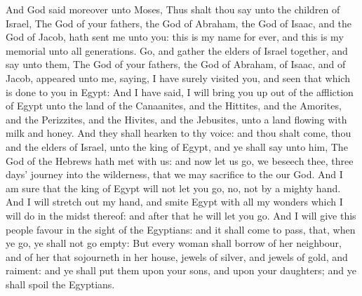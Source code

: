 \begin{biblechapter}
\verse And God said moreover unto Moses, Thus shalt thou say unto the children of Israel, The \LORD God of your fathers, the God of Abraham, the God of Isaac, and the God of Jacob, hath sent me unto you: this is my name for ever, and this is my memorial unto all generations.
\verse Go, and gather the elders of Israel together, and say unto them, The \LORD God of your fathers, the God of Abraham, of Isaac, and of Jacob, appeared unto me, saying, I have surely visited you, and seen that which is done to you in Egypt:
\verse And I have said, I will bring you up out of the affliction of Egypt unto the land of the Canaanites, and the Hittites, and the Amorites, and the Perizzites, and the Hivites, and the Jebusites, unto a land flowing with milk and honey.
\verse And they shall hearken to thy voice: and thou shalt come, thou and the elders of Israel, unto the king of Egypt, and ye shall say unto him, The \LORD God of the Hebrews hath met with us: and now let us go, we beseech thee, three days' journey into the wilderness, that we may sacrifice to the \LORD our God.
\verse And I am sure that the king of Egypt will not let you go, no, not by a mighty hand.
\verse And I will stretch out my hand, and smite Egypt with all my wonders which I will do in the midst thereof: and after that he will let you go.
\verse And I will give this people favour in the sight of the Egyptians: and it shall come to pass, that, when ye go, ye shall not go empty:
\verse But every woman shall borrow of her neighbour, and of her that sojourneth in her house, jewels of silver, and jewels of gold, and raiment: and ye shall put them upon your sons, and upon your daughters; and ye shall spoil the Egyptians.
\end{biblechapter}

